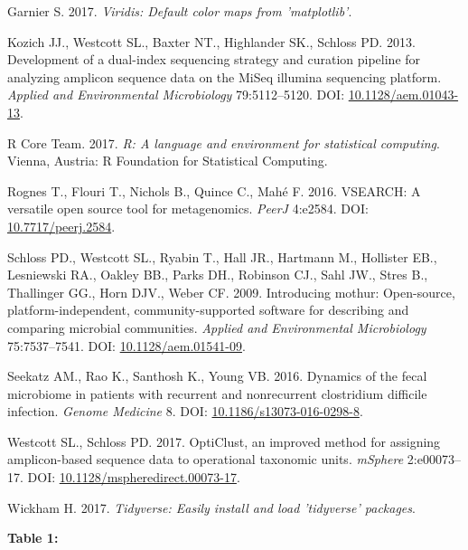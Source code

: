\documentclass[12pt,]{article}
\begin{document}
\hypertarget{ref-viridis_citation_2017}{}
Garnier S. 2017. \emph{Viridis: Default color maps from 'matplotlib'}.

\hypertarget{ref-protocol_Kozich_2013}{}
Kozich JJ., Westcott SL., Baxter NT., Highlander SK., Schloss PD. 2013.
Development of a dual-index sequencing strategy and curation pipeline
for analyzing amplicon sequence data on the MiSeq illumina sequencing
platform. \emph{Applied and Environmental Microbiology} 79:5112--5120.
DOI: \href{https://doi.org/10.1128/aem.01043-13}{10.1128/aem.01043-13}.

\hypertarget{ref-r_citation_2017}{}
R Core Team. 2017. \emph{R: A language and environment for statistical
computing}. Vienna, Austria: R Foundation for Statistical Computing.

\hypertarget{ref-vsearch_Rognes_2016}{}
Rognes T., Flouri T., Nichols B., Quince C., Mahé F. 2016. VSEARCH: A
versatile open source tool for metagenomics. \emph{PeerJ} 4:e2584. DOI:
\href{https://doi.org/10.7717/peerj.2584}{10.7717/peerj.2584}.

\hypertarget{ref-mothur_schloss_2009}{}
Schloss PD., Westcott SL., Ryabin T., Hall JR., Hartmann M., Hollister
EB., Lesniewski RA., Oakley BB., Parks DH., Robinson CJ., Sahl JW.,
Stres B., Thallinger GG., Horn DJV., Weber CF. 2009. Introducing mothur:
Open-source, platform-independent, community-supported software for
describing and comparing microbial communities. \emph{Applied and
Environmental Microbiology} 75:7537--7541. DOI:
\href{https://doi.org/10.1128/aem.01541-09}{10.1128/aem.01541-09}.

\hypertarget{ref-erin_seekatz_2016}{}
Seekatz AM., Rao K., Santhosh K., Young VB. 2016. Dynamics of the fecal
microbiome in patients with recurrent and nonrecurrent clostridium
difficile infection. \emph{Genome Medicine} 8. DOI:
\href{https://doi.org/10.1186/s13073-016-0298-8}{10.1186/s13073-016-0298-8}.

\hypertarget{ref-opticlust_Westcott_2017}{}
Westcott SL., Schloss PD. 2017. OptiClust, an improved method for
assigning amplicon-based sequence data to operational taxonomic units.
\emph{mSphere} 2:e00073--17. DOI:
\href{https://doi.org/10.1128/mspheredirect.00073-17}{10.1128/mspheredirect.00073-17}.

\hypertarget{ref-tidyverse_2017}{}
Wickham H. 2017. \emph{Tidyverse: Easily install and load 'tidyverse'
packages}.

\newpage

\textbf{Table 1: }

\footnotesize
\end{document}
